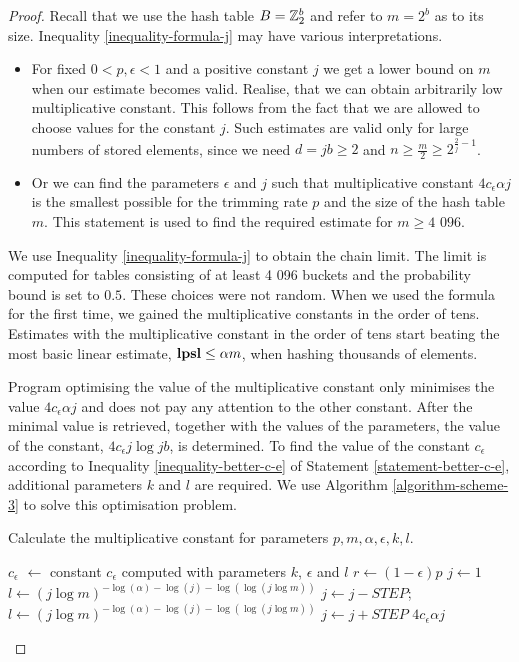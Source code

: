 \begin{proof}
Recall that we use the hash table $B = \mathbb{Z}_{2}^{b}$ and refer to $m = 2 ^ b$ as to its size. Inequality \ref{inequality-formula-j} may have various interpretations.
\begin{itemize}
\item For fixed $0 < p, \epsilon < 1$ and a positive constant $j$ we get a lower bound on $m$ when our estimate becomes valid. Realise, that we can obtain arbitrarily low multiplicative constant. This follows from the fact that we are allowed to choose values for the constant $j$. Such estimates are valid only for large numbers of stored elements, since we need $d = jb \geq 2$ and $n \geq \frac{m}{2} \geq 2 ^ {\frac{2}{j} - 1}$.
\item Or we can find the parameters $\epsilon$ and $j$ such that multiplicative constant $4 c_\epsilon \alpha j$ is the smallest possible for the trimming rate $p$ and the size of the hash table $m$. This statement is used to find the required estimate for $m \geq \text{4 096}$.
\end{itemize}

We use Inequality \ref{inequality-formula-j} to obtain the chain limit. The limit is computed for tables consisting of at least 4 096 buckets and the probability bound is set to $0.5$. These choices were not random. When we used the formula for the first time, we gained the multiplicative constants in the order of tens. Estimates with the multiplicative constant in the order of tens start beating the most basic linear estimate, $\mathbf{lpsl} \leq \alpha m$, when hashing thousands of elements.

Program optimising the value of the multiplicative constant only minimises the value $4 c_\epsilon \alpha j$ and does not pay any attention to the other constant. After the minimal value is retrieved, together with the values of the parameters, the value of the constant, $4 c_\epsilon j \log j b$, is determined. To find the value of the constant $c_\epsilon$ according to Inequality \ref{inequality-better-c-e} of Statement \ref{statement-better-c-e}, additional parameters $k$ and $l$ are required. We use Algorithm \ref{algorithm-scheme-3} to solve this optimisation problem.

\begin{algorithm}[H]
\caption{Calculate the multiplicative constant for parameters $p, m, \alpha, \epsilon, k, l$.}
\label{procedure-scheme-3}
\begin{algorithmic}
\STATE $c_\epsilon$ $\leftarrow$ constant $c_\epsilon$ computed with parameters $k$, $\epsilon$ and $l$
\STATE $r \leftarrow (1 - \epsilon)p$ 
\STATE $j \leftarrow 1$
\STATE 
\STATE {}
\STATE $l \leftarrow (j \log m) ^ {-\log(\alpha) - \log(j) - \log(\log(j \log m))}$
	\STATE $j \leftarrow j - STEP$;
	\STATE $l \leftarrow (j \log m) ^ {-\log(\alpha) - \log(j) - \log(\log(j \log m))}$
\ENDWHILE
\STATE
\STATE $j \leftarrow j + STEP$
\RETURN $4 c_\epsilon \alpha j$
\end{algorithmic}
\end{algorithm}


\end{proof}
